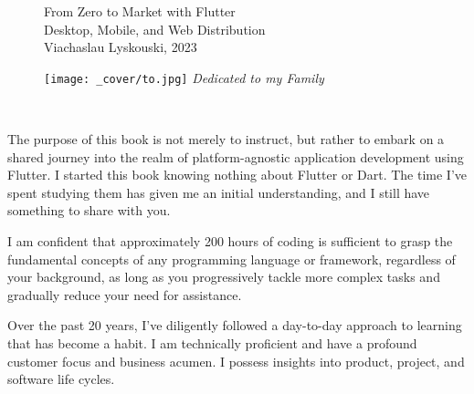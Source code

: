 
\thispagestyle{empty}

\begin{figure}
  \begin{minipage}{0.59\textwidth}
    \large From Zero to Market with Flutter\\
    \vspace{9mm}
    \noindent \small Desktop, Mobile, and Web Distribution\\
    \vspace{10mm}
    Viachaslau Lyskouski, 2023\\
    \vspace{2mm}
  \end{minipage}
  \hfill
  \begin{minipage}{0.31\textwidth}
    \texttt{[image: \_cover/to.jpg]}
    \emph{Dedicated to my Family}\\
  \end{minipage}
\end{figure}
~
\vspace{2cm}

\noindent The purpose of this book is not merely to instruct, but rather to embark on a shared journey into the realm of 
platform-agnostic application development using Flutter. I started this book knowing nothing about Flutter or Dart. The 
time I've spent studying them has given me an initial understanding, and I still have something to share with you. 

\vspace{3mm}

\noindent I am confident that approximately 200 hours of coding is sufficient to grasp the fundamental concepts of any 
programming language or framework, regardless of your background, as long as you progressively tackle more complex tasks 
and gradually reduce your need for assistance.

\vspace{3mm}

\noindent Over the past 20 years, I've diligently followed a day-to-day approach to learning that has become a habit. I 
am technically proficient and have a profound customer focus and business acumen. I possess insights into product, 
project, and software life cycles.

\vspace{3mm}

